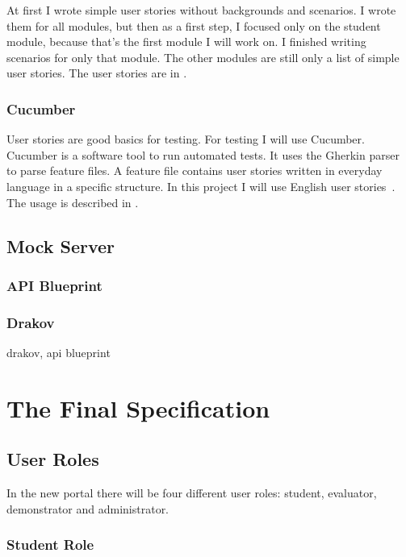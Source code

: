 At first I wrote simple user stories without backgrounds and scenarios. I wrote them for all modules, but then as a first step, I focused only on the student module, because that's the first module I will work on. I finished writing scenarios for only that module. The other modules are still only a list of simple user stories. The user stories are in .

\subsubsection{Cucumber}
User stories are good basics for testing. For testing I will use Cucumber. Cucumber is a software tool to run automated tests. It uses the Gherkin parser to parse feature files. A feature file contains user stories written in everyday language in a specific structure. In this project I will use English user stories~\cite{Cucumber-gherkin}. The usage is described in .


\subsection{Mock Server}

\subsubsection{API Blueprint}
\label{api-blueprint}

\subsubsection{Drakov}

drakov, api blueprint

\section{The Final Specification} \label{final-spec}
\subsection{User Roles}

In the new portal there will be four different user roles: student, evaluator, demonstrator and administrator. 

\subsubsection{Student Role}

